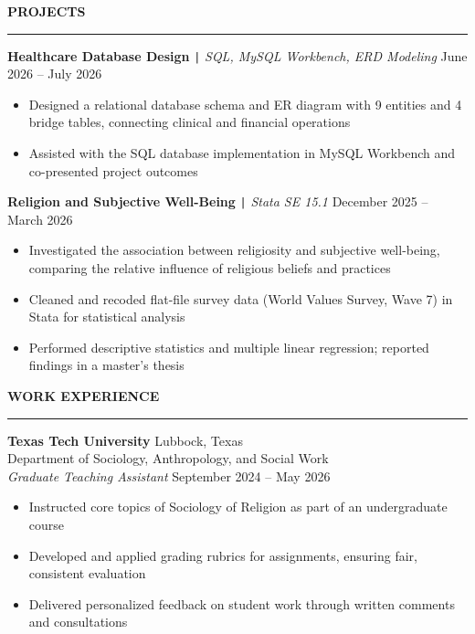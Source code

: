 \documentclass[letterpaper, 11pt]{article}
\begin{document}
    \noindent
    \textbf{\large PROJECTS}
    \vspace{0.3em} %
    \hrule
    \vspace{0.5em}

    \noindent
    \textbf{Healthcare Database Design} \verb!|! \textit{SQL, MySQL Workbench, ERD Modeling} \hfill June 2026 -- July 2026
    \begin{itemize}[noitemsep, topsep=4pt, itemsep=2pt]
        \item Designed a relational database schema and ER diagram with 9 entities and 4 bridge tables, connecting clinical and financial
        operations
        \item Assisted with the SQL database implementation in MySQL Workbench and co-presented project outcomes
    \end{itemize} 
    \vspace{0.3em}

    \noindent
    \textbf{Religion and Subjective Well-Being} \verb!|! \textit{Stata SE 15.1} \hfill December 2025 -- March 2026
    \begin{itemize}[noitemsep, topsep=4pt, itemsep=2pt]
        \item Investigated the association between religiosity and subjective well-being, comparing the relative influence of religious beliefs
        and practices
        \item Cleaned and recoded flat-file survey data (World Values Survey, Wave 7) in Stata for statistical analysis
        \item Performed descriptive statistics and multiple linear regression; reported findings in a master's thesis

    \end{itemize} 
    \vspace{0.5em}
    \noindent
    \textbf{\large WORK EXPERIENCE} \vspace{0.3em}
    \hrule
    \vspace{0.5em}

    \noindent
    \textbf{Texas Tech University} \hfill Lubbock, Texas \\
    Department of Sociology, Anthropology, and Social Work\\
    \textit{Graduate Teaching Assistant} \hfill September 2024 -- May 2026
    \begin{itemize}[noitemsep, topsep=4pt, itemsep=2pt]
        \item Instructed core topics of Sociology of Religion as part of an undergraduate course
        \item Developed and applied grading rubrics for assignments, ensuring fair, consistent evaluation
        \item Delivered personalized feedback on student work through written comments and consultations
    \end{itemize} 
    \vspace{0.3em}
\end{document}
